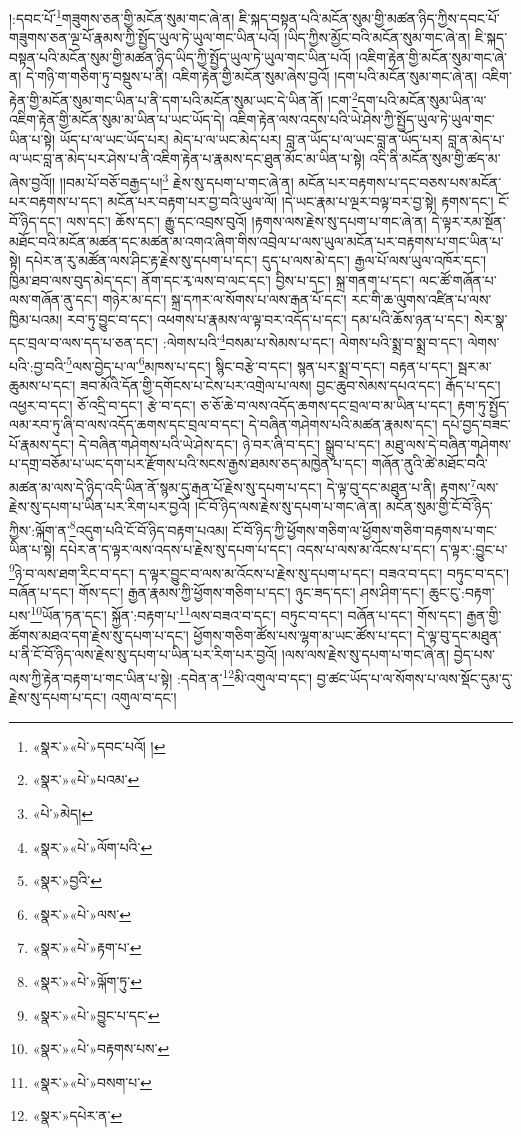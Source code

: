 །:དབང་པོ་\footnote{«སྣར་»«པེ་»དབང་པའོ། །}གཟུགས་ཅན་གྱི་མངོན་སུམ་གང་ཞེ་ན། ཇི་སྐད་བསྟན་པའི་མངོན་སུམ་གྱི་མཚན་ཉིད་ཀྱིས་དབང་པོ་གཟུགས་ཅན་ལྔ་པོ་རྣམས་ཀྱི་སྤྱོད་ཡུལ་ཏེ་ཡུལ་གང་ཡིན་པའོ། །ཡིད་ཀྱིས་མྱོང་བའི་མངོན་སུམ་གང་ཞེ་ན། ཇི་སྐད་བསྟན་པའི་མངོན་སུམ་གྱི་མཚན་ཉིད་ཡིད་ཀྱི་སྤྱོད་ཡུལ་ཏེ་ཡུལ་གང་ཡིན་པའོ། །འཇིག་རྟེན་གྱི་མངོན་སུམ་གང་ཞེ་ན། དེ་གཉི་ག་གཅིག་ཏུ་བསྡུས་པ་ནི། འཇིག་རྟེན་གྱི་མངོན་སུམ་ཞེས་བྱའོ། །དག་པའི་མངོན་སུམ་གང་ཞེ་ན། འཇིག་རྟེན་གྱི་མངོན་སུམ་གང་ཡིན་པ་ནི་དག་པའི་མངོན་སུམ་ཡང་དེ་ཡིན་ནོ། །ངག་\footnote{«སྣར་»«པེ་»པའམ་}དག་པའི་མངོན་སུམ་ཡིན་ལ་འཇིག་རྟེན་གྱི་མངོན་སུམ་མ་ཡིན་པ་ཡང་ཡོད་དེ། འཇིག་རྟེན་ལས་འདས་པའི་ཡེ་ཤེས་ཀྱི་སྤྱོད་ཡུལ་ཏེ་ཡུལ་གང་ཡིན་པ་སྟེ། ཡོད་པ་ལ་ཡང་ཡོད་པར། མེད་པ་ལ་ཡང་མེད་པར། བླ་ན་ཡོད་པ་ལ་ཡང་བླ་ན་ཡོད་པར། བླ་ན་མེད་པ་ལ་ཡང་བླ་ན་མེད་པར་ཤེས་པ་ནི་འཇིག་རྟེན་པ་རྣམས་དང་ཐུན་མོང་མ་ཡིན་པ་སྟེ། འདི་ནི་མངོན་སུམ་གྱི་ཚད་མ་ཞེས་བྱའོ།། །།བམ་པོ་བཅོ་བརྒྱད་པ།\footnote{«པེ་»མེད།} རྗེས་སུ་དཔག་པ་གང་ཞེ་ན། མངོན་པར་བརྟགས་པ་དང་བཅས་པས་མངོན་པར་བརྟགས་པ་དང་། མངོན་པར་བརྟག་པར་བྱ་བའི་ཡུལ་ལོ། །དེ་ཡང་རྣམ་པ་ལྔར་བལྟ་བར་བྱ་སྟེ། རྟགས་དང་། ངོ་བོ་ཉིད་དང་། ལས་དང་། ཆོས་དང་། རྒྱུ་དང་འབྲས་བུའོ། །རྟགས་ལས་རྗེས་སུ་དཔག་པ་གང་ཞེ་ན། དེ་ལྟར་རམ་སྔོན་མཐོང་བའི་མངོན་མཚན་དང་མཚན་མ་འགའ་ཞིག་གིས་འབྲེལ་པ་ལས་ཡུལ་མངོན་པར་བརྟགས་པ་གང་ཡིན་པ་སྟེ། དཔེར་ན་རུ་མཚོན་ལས་ཤིང་རྟ་རྗེས་སུ་དཔག་པ་དང་། དུད་པ་ལས་མེ་དང་། རྒྱལ་པོ་ལས་ཡུལ་འཁོར་དང་། ཁྱིམ་ཐབ་ལས་བུད་མེད་དང་། ནོག་དང་རྭ་ལས་བ་ལང་དང་། བྱིས་པ་དང་། སྐྲ་གནག་པ་དང་། ལང་ཚོ་གཞོན་པ་ལས་གཞོན་ནུ་དང་། གཉེར་མ་དང་། སྐྲ་དཀར་ལ་སོགས་པ་ལས་རྒན་པོ་དང་། རང་གི་ཆ་ལུགས་འཛིན་པ་ལས་ཁྱིམ་པའམ། རབ་ཏུ་བྱུང་བ་དང་། འཕགས་པ་རྣམས་ལ་ལྟ་བར་འདོད་པ་དང་། དམ་པའི་ཆོས་ཉན་པ་དང་། སེར་སྣ་དང་བྲལ་བ་ལས་དད་པ་ཅན་དང་། :ལེགས་པའི་\footnote{«སྣར་»«པེ་»ལོག་པའི་}བསམ་པ་སེམས་པ་དང་། ལེགས་པའི་སྨྲ་བ་སྨྲ་བ་དང་། ལེགས་པའི་:བྱ་བའི་\footnote{«སྣར་»བྱའི་}ལས་བྱེད་པ་ལ་\footnote{«སྣར་»«པེ་»ལས་}མཁས་པ་དང་། སྙིང་བརྩེ་བ་དང་། སྙན་པར་སྨྲ་བ་དང་། བརྟན་པ་དང་། སྦར་མ་ཆུམས་པ་དང་། ཟབ་མོའི་དོན་གྱི་དགོངས་པ་ངེས་པར་འགྲེལ་པ་ལས། བྱང་ཆུབ་སེམས་དཔའ་དང་། རྒོད་པ་དང་། འཕྱར་བ་དང་། ཅོ་འདྲི་བ་དང་། རྩེ་བ་དང་། ཅ་ཅོ་ཆེ་བ་ལས་འདོད་ཆགས་དང་བྲལ་བ་མ་ཡིན་པ་དང་། རྟག་ཏུ་སྤྱོད་ལམ་རབ་ཏུ་ཞི་བ་ལས་འདོད་ཆགས་དང་བྲལ་བ་དང་། དེ་བཞིན་གཤེགས་པའི་མཚན་རྣམས་དང་། དཔེ་བྱད་བཟང་པོ་རྣམས་དང་། དེ་བཞིན་གཤེགས་པའི་ཡེ་ཤེས་དང་། ཉེ་བར་ཞི་བ་དང་། སྒྲུབ་པ་དང་། མཐུ་ལས་དེ་བཞིན་གཤེགས་པ་དགྲ་བཅོམ་པ་ཡང་དག་པར་རྫོགས་པའི་སངས་རྒྱས་ཐམས་ཅད་མཁྱེན་པ་དང་། གཞོན་ནུའི་ཚེ་མཐོང་བའི་མཚན་མ་ལས་དེ་ཉིད་འདི་ཡིན་ནོ་སྙམ་དུ་རྒན་པོ་རྗེས་སུ་དཔག་པ་དང་། དེ་ལྟ་བུ་དང་མཐུན་པ་ནི། རྟགས་\footnote{«སྣར་»«པེ་»རྟག་པ་}ལས་རྗེས་སུ་དཔག་པ་ཡིན་པར་རིག་པར་བྱའོ། །ངོ་བོ་ཉིད་ལས་རྗེས་སུ་དཔག་པ་གང་ཞེ་ན། མངོན་སུམ་གྱི་ངོ་བོ་ཉིད་ཀྱིས་:ལྐོག་ན་\footnote{«སྣར་»«པེ་»ལྐོག་ཏུ་}འདུག་པའི་ངོ་བོ་ཉིད་བརྟག་པའམ། ངོ་བོ་ཉིད་ཀྱི་ཕྱོགས་གཅིག་ལ་ཕྱོགས་གཅིག་བརྟགས་པ་གང་ཡིན་པ་སྟེ། དཔེར་ན་ད་ལྟར་ལས་འདས་པ་རྗེས་སུ་དཔག་པ་དང་། འདས་པ་ལས་མ་འོངས་པ་དང་། ད་ལྟར་:བྱུང་པ་\footnote{«སྣར་»«པེ་»བྱུང་པ་དང་}ཉེ་བ་ལས་ཐག་རིང་བ་དང་། ད་ལྟར་བྱུང་བ་ལས་མ་འོངས་པ་རྗེས་སུ་དཔག་པ་དང་། བཟའ་བ་དང་། བཏུང་བ་དང་། བཞོན་པ་དང་། གོས་དང་། རྒྱན་རྣམས་ཀྱི་ཕྱོགས་གཅིག་པ་དང་། ཉུང་ཟད་དང་། ཤས་ཤིག་དང་། ཆུང་ངུ་:བརྟག་པས་\footnote{«སྣར་»«པེ་»བརྟགས་པས་}ཡོན་ཏན་དང་། སྐྱོན་:བརྟག་པ་\footnote{«སྣར་»«པེ་»བསག་པ་}ལས་བཟའ་བ་དང་། བཏུང་བ་དང་། བཞོན་པ་དང་། གོས་དང་། རྒྱན་གྱི་ཚོགས་མཐའ་དག་རྗེས་སུ་དཔག་པ་དང་། ཕྱོགས་གཅིག་ཚོས་པས་ལྷག་མ་ཡང་ཚོས་པ་དང་། དེ་ལྟ་བུ་དང་མཐུན་པ་ནི་ངོ་བོ་ཉིད་ལས་རྗེས་སུ་དཔག་པ་ཡིན་པར་རིག་པར་བྱའོ། །ལས་ལས་རྗེས་སུ་དཔག་པ་གང་ཞེ་ན། བྱེད་པས་ལས་ཀྱི་རྟེན་བརྟག་པ་གང་ཡིན་པ་སྟེ། :དབེན་ན་\footnote{«སྣར་»དཔེར་ན་}མི་འགུལ་བ་དང་། བྱ་ཚང་ཡོད་པ་ལ་སོགས་པ་ལས་སྡོང་དུམ་དུ་རྗེས་སུ་དཔག་པ་དང་། འགུལ་བ་དང་། 